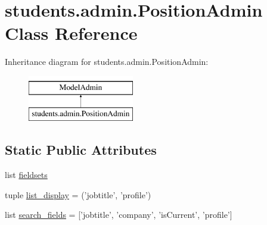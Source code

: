 \hypertarget{classstudents_1_1admin_1_1_position_admin}{\section{students.\-admin.\-Position\-Admin Class Reference}
\label{classstudents_1_1admin_1_1_position_admin}
}
Inheritance diagram for students.\-admin.\-Position\-Admin\-:\begin{figure}[H]
\begin{center}
\leavevmode
\includegraphics[height=2.000000cm]{classstudents_1_1admin_1_1_position_admin}
\end{center}
\end{figure}
\subsection*{Static Public Attributes}
\begin{DoxyCompactItemize}
\item 
list \hyperlink{classstudents_1_1admin_1_1_position_admin_ae4bf16213a76a16c62a36c5b68b6800b}{fieldsets}
\item 
tuple \hyperlink{classstudents_1_1admin_1_1_position_admin_a2b0a01f8594cfa3438e55d2d61bb3e05}{list\-\_\-display} = ('jobtitle', 'profile')
\item 
list \hyperlink{classstudents_1_1admin_1_1_position_admin_ae3055ae3ee6dd5e1b60b35b818f0ad1f}{search\-\_\-fields} = \mbox{[}'jobtitle', 'company', 'is\-Current', 'profile'\mbox{]}
\end{DoxyCompactItemize}


